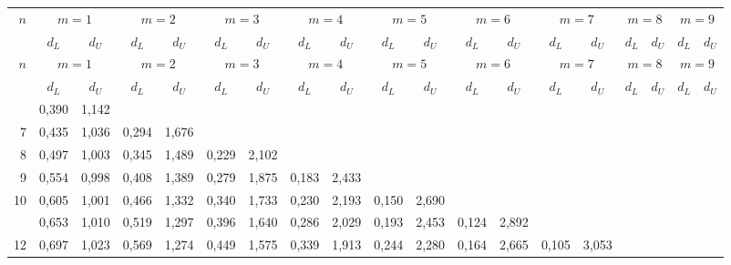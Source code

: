 \documentclass[12pt,a4paper]{article}
\renewcommand{\arraystretch}{1.0}
\begin{document}
\clearpage
{}\par\smallskip
{\scriptsize
\setlength{\tabcolsep}{1.5pt}
\renewcommand{\arraystretch}{1.05}
\begin{longtable}{@{\extracolsep{\fill}}rcccccccccccccccccc@{}}
\toprule
$n$ & \multicolumn{2}{c}{$m = 1$} & \multicolumn{2}{c}{$m = 2$} & \multicolumn{2}{c}{$m = 3$} & \multicolumn{2}{c}{$m = 4$} & \multicolumn{2}{c}{$m = 5$} & \multicolumn{2}{c}{$m = 6$} & \multicolumn{2}{c}{$m = 7$} & \multicolumn{2}{c}{$m = 8$} & \multicolumn{2}{c}{$m = 9$} \\
\cmidrule(lr){2-3} \cmidrule(lr){4-5} \cmidrule(lr){6-7} \cmidrule(lr){8-9} \cmidrule(lr){10-11} \cmidrule(lr){12-13} \cmidrule(lr){14-15} \cmidrule(lr){16-17} \cmidrule(lr){18-19}
 & $d_L$ & $d_U$ & $d_L$ & $d_U$ & $d_L$ & $d_U$ & $d_L$ & $d_U$ & $d_L$ & $d_U$ & $d_L$ & $d_U$ & $d_L$ & $d_U$ & $d_L$ & $d_U$ & $d_L$ & $d_U$ \\
\midrule
\endfirsthead
\toprule
$n$ & \multicolumn{2}{c}{$m = 1$} & \multicolumn{2}{c}{$m = 2$} & \multicolumn{2}{c}{$m = 3$} & \multicolumn{2}{c}{$m = 4$} & \multicolumn{2}{c}{$m = 5$} & \multicolumn{2}{c}{$m = 6$} & \multicolumn{2}{c}{$m = 7$} & \multicolumn{2}{c}{$m = 8$} & \multicolumn{2}{c}{$m = 9$} \\
\cmidrule(lr){2-3} \cmidrule(lr){4-5} \cmidrule(lr){6-7} \cmidrule(lr){8-9} \cmidrule(lr){10-11} \cmidrule(lr){12-13} \cmidrule(lr){14-15} \cmidrule(lr){16-17} \cmidrule(lr){18-19}
 & $d_L$ & $d_U$ & $d_L$ & $d_U$ & $d_L$ & $d_U$ & $d_L$ & $d_U$ & $d_L$ & $d_U$ & $d_L$ & $d_U$ & $d_L$ & $d_U$ & $d_L$ & $d_U$ & $d_L$ & $d_U$ \\
\midrule
\endhead
\bottomrule
\endfoot
6 & 0,390 & 1,142 &  &  &  &  &  &  &  &  &  &  &  &  &  &  &  &  \\
7 & 0,435 & 1,036 & 0,294 & 1,676 &  &  &  &  &  &  &  &  &  &  &  &  &  &  \\
8 & 0,497 & 1,003 & 0,345 & 1,489 & 0,229 & 2,102 &  &  &  &  &  &  &  &  &  &  &  &  \\
9 & 0,554 & 0,998 & 0,408 & 1,389 & 0,279 & 1,875 & 0,183 & 2,433 &  &  &  &  &  &  &  &  &  &  \\
10 & 0,605 & 1,001 & 0,466 & 1,332 & 0,340 & 1,733 & 0,230 & 2,193 & 0,150 & 2,690 &  &  &  &  &  &  &  &  \\
\addlinespace[2pt]
11 & 0,653 & 1,010 & 0,519 & 1,297 & 0,396 & 1,640 & 0,286 & 2,029 & 0,193 & 2,453 & 0,124 & 2,892 &  &  &  &  &  &  \\
12 & 0,697 & 1,023 & 0,569 & 1,274 & 0,449 & 1,575 & 0,339 & 1,913 & 0,244 & 2,280 & 0,164 & 2,665 & 0,105 & 3,053 &  &  &  &  \\

\end{longtable}}
\end{document}
